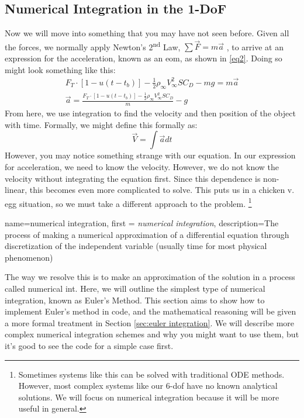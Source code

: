 \documentclass[12pt]{report}
\begin{document}
\subsection{Numerical Integration in the 1-DoF}\label{sec: Numerical Integration in the 1DoF}
Now we will move into something that you may have not seen before. Given all the forces, we normally apply Newton’s 2\textsuperscript{nd} Law, $\sum{\vec{F}}=m\vec{a}$ , to arrive at an expression for the acceleration, known as an \gls{eom}, as shown in \eqref{eq2}. Doing so might look something like this:
\begin{gather}
F_T \cdot [1-u(t-t_b)]-\frac{1}{2}\rho_{\infty}V_{\infty}^2SC_D-mg=m\vec{a}\label{eq1} \\
\vec{a}=\frac{F_T \cdot [1-u(t-t_b)]-\frac{1}{2}\rho_{\infty}V_{\infty}^2SC_D}{m}-g\label{eq2}
\end{gather}
 From here, we use integration to find the velocity and then position of the object with time. Formally, we might define this formally as:
 $$\vec{V}=\int{\vec{a}}{dt}$$
However, you may notice something strange with our equation. In our expression for acceleration, we need to know the velocity. However, we do not know the velocity without integrating the equation first. Since this dependence is non-linear, this becomes even more complicated to solve. This puts us in a chicken v. egg situation, so we must take a different approach to the problem. \footnote{Sometimes systems like this can be solved with traditional ODE methods. However, most complex systems like our 6-\gls{dof} have no known analytical solutions. We will focus on numerical integration because it will be more useful in general. }

{
    name=numerical integration,
    first = {\textit{numerical integration}},
    description={The process of making a numerical approximation of a differential equation through discretization of the independent variable (usually time for most physical phenomenon)}
}

The way we resolve this is to make an approximation of the solution in a process called \gls{numerical int}. Here, we will outline the simplest type of numerical integration, known as Euler’s Method. This section aims to show how to implement Euler’s method in code, and the mathematical reasoning will be given a more formal treatment in Section \ref{sec:euler integration}. We will describe more complex numerical integration schemes and why you might want to use them, but it’s good to see the code for a simple case first.
\end{document}
